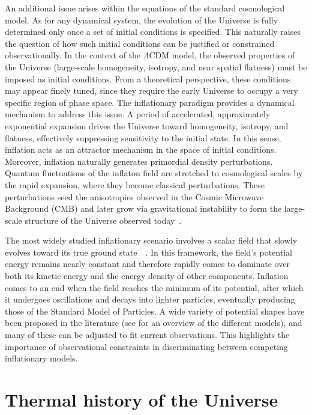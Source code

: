 \documentclass[../../thesis.tex]{subfiles}
\begin{document}
An additional issue arises within the equations of the standard cosmological model. As for any dynamical system, the evolution of the Universe is fully determined only once a set of initial conditions is specified. This naturally raises the question of how such initial conditions can be justified or constrained observationally. In the context of the $\Lambda$CDM model, the observed properties of the Universe (large-scale homogeneity, isotropy, and near spatial flatness) must be imposed as initial conditions. From a theoretical perspective, these conditions may appear finely tuned, since they require the early Universe to occupy a very specific region of phase space. The inflationary paradigm provides a dynamical mechanism to address this issue. A period of accelerated, approximately exponential expansion drives the Universe toward homogeneity, isotropy, and flatness, effectively suppressing sensitivity to the initial state. In this sense, inflation acts as an attractor mechanism in the space of initial conditions. Moreover, inflation naturally generates primordial density perturbations. Quantum fluctuations of the inflaton field are stretched to cosmological scales by the rapid expansion, where they become classical perturbations. These perturbations seed the anisotropies observed in the Cosmic Microwave Background (CMB) and later grow via gravitational instability to form the large-scale structure of the Universe observed today~\cite{mukhanov1985}.

The most widely studied inflationary scenario involves a scalar field that slowly evolves toward its true ground state~\cite{linde1982}~\cite{albrecht_steinhardt1982}. In this framework, the field’s potential energy remains nearly constant and therefore rapidly comes to dominate over both its kinetic energy and the energy density of other components. Inflation comes to an end when the field reaches the minimum of its potential, after which it undergoes oscillations and decays into lighter particles, eventually producing those of the Standard Model of Particles. A wide variety of potential shapes have been proposed in the literature (see \cite{inflation_overview2014} for an overview of the different models), and many of these can be adjusted to fit current observations. This highlights the importance of observational constraints in discriminating between competing inflationary models.

\section{Thermal history of the Universe}
\end{document}
